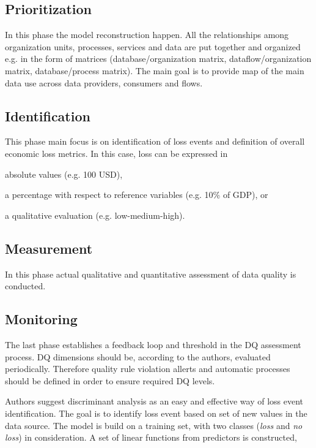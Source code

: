 \subsection{Prioritization}

In this phase the model reconstruction happen.
All the relationships among organization units, processes, services and data are put together and organized e.g. in the form of matrices (database/organization matrix, dataflow/organization matrix, database/process matrix).
The main goal is to provide map of the main data use across data providers, consumers and flows.

\subsection{Identification}

This phase main focus is on identification of loss events and definition of overall economic loss metrics.
In this case, loss can be expressed in 
\begin{enumerate*}[label=(\roman*)]
    \item absolute values (e.g. 100 USD),
    \item a percentage with respect to reference variables (e.g. 10\% of GDP), or
    \item a qualitative evaluation (e.g. low-medium-high).
\end{enumerate*}

\subsection{Measurement}

In this phase actual qualitative and quantitative assessment of data quality is conducted.

\subsection{Monitoring}

The last phase establishes a feedback loop and threshold in the DQ assessment process.
DQ dimensions should be, according to the authors, evaluated periodically.
Therefore quality rule violation allerts and automatic processes should be defined in order to ensure required DQ levels.

Authors suggest discriminant analysis as an easy and effective way of loss event identification.
The goal is to identify loss event based on set of new values in the data source.
The model is build on a training set, with two classes (\textit{loss} and \textit{no loss}) in consideration.
A set of linear functions from predictors is constructed,

